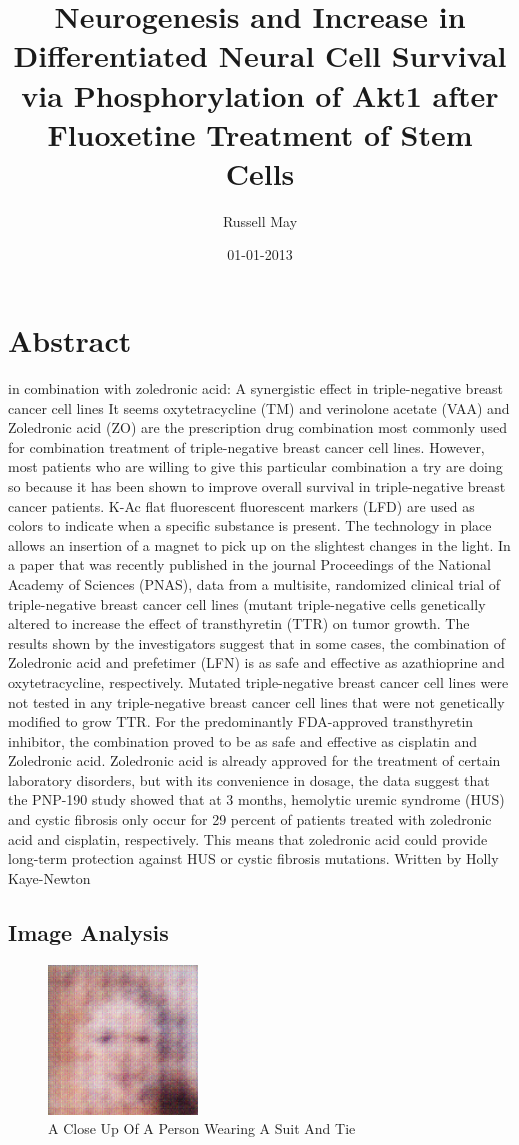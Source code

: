 \documentclass{article}%
\title{Neurogenesis and Increase in Differentiated Neural Cell Survival via Phosphorylation of Akt1 after Fluoxetine Treatment of Stem Cells}%
\author{Russell May}%
\affil{Blood Transfusion Centre of Slovenia, Ljubljana, Slovenia}%
\date{01{-}01{-}2013}%
\begin{document}
%
\normalsize%
\maketitle%
\section{Abstract}%
\label{sec:Abstract}%
in combination with zoledronic acid: A synergistic effect in triple{-}negative breast cancer cell lines\newline%
It seems oxytetracycline (TM) and verinolone acetate (VAA) and Zoledronic acid (ZO) are the prescription drug combination most commonly used for combination treatment of triple{-}negative breast cancer cell lines. However, most patients who are willing to give this particular combination a try are doing so because it has been shown to improve overall survival in triple{-}negative breast cancer patients.\newline%
K{-}Ac flat fluorescent fluorescent markers (LFD) are used as colors to indicate when a specific substance is present. The technology in place allows an insertion of a magnet to pick up on the slightest changes in the light. In a paper that was recently published in the journal Proceedings of the National Academy of Sciences (PNAS), data from a multisite, randomized clinical trial of triple{-}negative breast cancer cell lines (mutant triple{-}negative cells genetically altered to increase the effect of transthyretin (TTR) on tumor growth.\newline%
The results shown by the investigators suggest that in some cases, the combination of Zoledronic acid and prefetimer (LFN) is as safe and effective as azathioprine and oxytetracycline, respectively. Mutated triple{-}negative breast cancer cell lines were not tested in any triple{-}negative breast cancer cell lines that were not genetically modified to grow TTR. For the predominantly FDA{-}approved transthyretin inhibitor, the combination proved to be as safe and effective as cisplatin and Zoledronic acid.\newline%
Zoledronic acid is already approved for the treatment of certain laboratory disorders, but with its convenience in dosage, the data suggest that the PNP{-}190 study showed that at 3 months, hemolytic uremic syndrome (HUS) and cystic fibrosis only occur for 29 percent of patients treated with zoledronic acid and cisplatin, respectively. This means that zoledronic acid could provide long{-}term protection against HUS or cystic fibrosis mutations.\newline%
Written by Holly Kaye{-}Newton

%
\subsection{Image Analysis}%
\label{subsec:ImageAnalysis}%


\begin{figure}[h!]%
\centering%
\includegraphics[width=150px]{500_fake_images/samples_5_472.png}%
\caption{A Close Up Of A Person Wearing A Suit And Tie}%
\end{figure}

%
\end{document}
